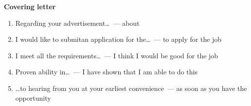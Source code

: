 \documentclass[10pt,a4paper]{article}
\begin{document}
\par\medskip\textbf{Covering letter}
\begin{enumerate}
  \item Regarding your advertisement\dots ~--- about
  \item I would like to submitan application for the\dots ~--- to apply for the job
  \item I meet all the requirements\dots ~--- I think I would be good for the job
  \item Proven ability in\dots ~--- I have shown that I am able to do this
  \item \dots to hearing from you at your earliest convenience~--- as soon as you have the opportunity
\end{enumerate}
\end{document}

